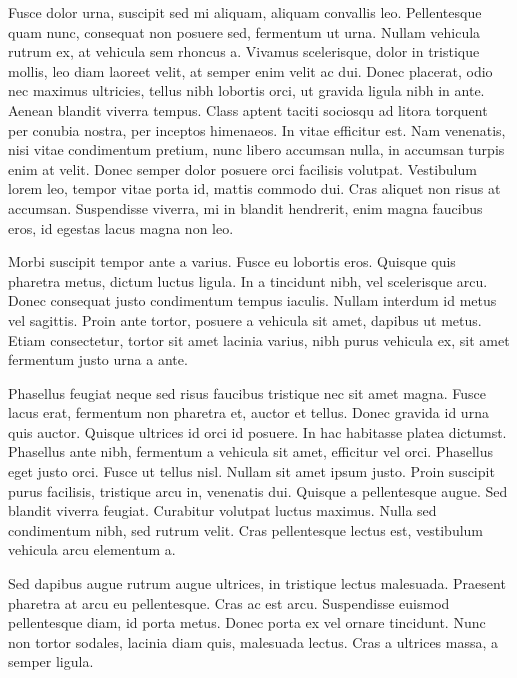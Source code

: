 Fusce dolor urna, suscipit sed mi aliquam, aliquam convallis leo. Pellentesque quam nunc, consequat non posuere sed, fermentum ut urna. Nullam vehicula rutrum ex, at vehicula sem rhoncus a. Vivamus scelerisque, dolor in tristique mollis, leo diam laoreet velit, at semper enim velit ac dui. Donec placerat, odio nec maximus ultricies, tellus nibh lobortis orci, ut gravida ligula nibh in ante. Aenean blandit viverra tempus. Class aptent taciti sociosqu ad litora torquent per conubia nostra, per inceptos himenaeos. In vitae efficitur est. Nam venenatis, nisi vitae condimentum pretium, nunc libero accumsan nulla, in accumsan turpis enim at velit. Donec semper dolor posuere orci facilisis volutpat. Vestibulum lorem leo, tempor vitae porta id, mattis commodo dui. Cras aliquet non risus at accumsan. Suspendisse viverra, mi in blandit hendrerit, enim magna faucibus eros, id egestas lacus magna non leo.

Morbi suscipit tempor ante a varius. Fusce eu lobortis eros. Quisque quis pharetra metus, dictum luctus ligula. In a tincidunt nibh, vel scelerisque arcu. Donec consequat justo condimentum tempus iaculis. Nullam interdum id metus vel sagittis. Proin ante tortor, posuere a vehicula sit amet, dapibus ut metus. Etiam consectetur, tortor sit amet lacinia varius, nibh purus vehicula ex, sit amet fermentum justo urna a ante.

Phasellus feugiat neque sed risus faucibus tristique nec sit amet magna. Fusce lacus erat, fermentum non pharetra et, auctor et tellus. Donec gravida id urna quis auctor. Quisque ultrices id orci id posuere. In hac habitasse platea dictumst. Phasellus ante nibh, fermentum a vehicula sit amet, efficitur vel orci. Phasellus eget justo orci. Fusce ut tellus nisl. Nullam sit amet ipsum justo. Proin suscipit purus facilisis, tristique arcu in, venenatis dui. Quisque a pellentesque augue. Sed blandit viverra feugiat. Curabitur volutpat luctus maximus. Nulla sed condimentum nibh, sed rutrum velit. Cras pellentesque lectus est, vestibulum vehicula arcu elementum a.

Sed dapibus augue rutrum augue ultrices, in tristique lectus malesuada. Praesent pharetra at arcu eu pellentesque. Cras ac est arcu. Suspendisse euismod pellentesque diam, id porta metus. Donec porta ex vel ornare tincidunt. Nunc non tortor sodales, lacinia diam quis, malesuada lectus. Cras a ultrices massa, a semper ligula.
